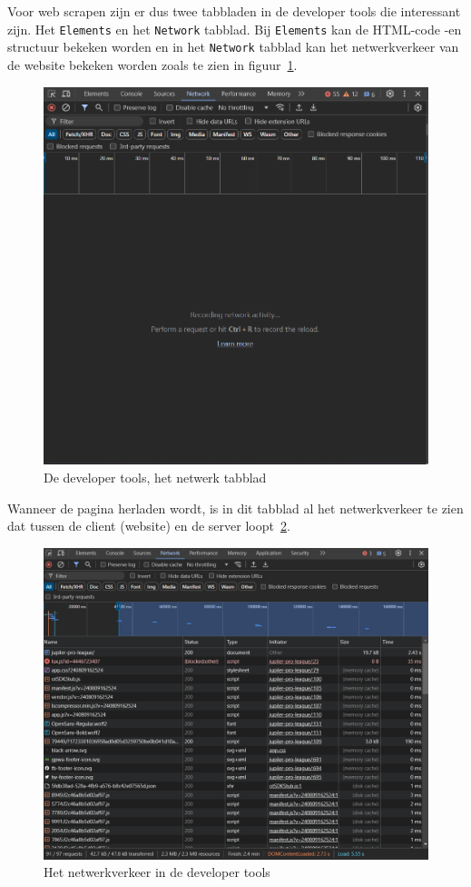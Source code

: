 Voor web scrapen zijn er dus twee tabbladen in de developer tools die interessant zijn. Het \texttt{Elements} en het \texttt{Network} tabblad. Bij \texttt{Elements} kan de HTML-code -en structuur bekeken worden en in het \texttt{Network} tabblad kan het netwerkverkeer van de website bekeken worden zoals te zien in figuur~\ref{fig:networktab}. 

\begin{figure}[h]
    \centering
    \includegraphics[width=\linewidth]{graphics/DevTools1.png}
    \caption{De developer tools, het netwerk tabblad}
    \label{fig:networktab}
\end{figure}

Wanneer de pagina herladen wordt, is in dit tabblad al het netwerkverkeer te zien dat tussen de client (website) en de server loopt~\ref{fig:networktab2}.

\begin{figure}[ht]
    \centering
    \includegraphics[width=\linewidth]{graphics/DevTools2.png}
    \caption{Het netwerkverkeer in de developer tools}
    \label{fig:networktab2}
\end{figure}

